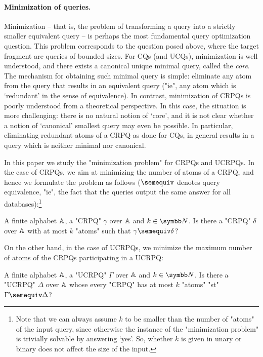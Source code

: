 \paragraph{Minimization of queries.}
Minimization -- that is, the problem of transforming a query into a strictly smaller equivalent 
query -- is perhaps the most fundamental query optimization question. This problem corresponds to the question posed above, where the target fragment are queries of bounded sizes. 
For CQs (and UCQs), minimization is well understood, and there exists a canonical unique minimal query, called the \emph{core}.
The mechanism for obtaining such minimal query is simple: eliminate any atom from the query that results in an equivalent query ("ie", any atom which is `redundant'  in the sense of equivalence).
In contrast, minimization of CRPQs is poorly understood from a theoretical perspective. In this case, the situation is more challenging: there is no natural notion of `core’, and it is not clear whether a notion of `canonical’ smallest query may even be possible. In particular, eliminating redundant atoms of a CRPQ as done for CQs, in general results in a query which is neither minimal nor canonical.

In this paper we study the "minimization problem" for CRPQs and UCRPQs. In the case of CRPQs, we aim at minimizing the number of atoms of a CRPQ, and hence we formulate the problem as follows ($\semequiv$ denotes query equivalence, "ie", the fact that the queries output the same answer for all databases):\footnote{Note that we can always assume $k$ to be smaller than the number of "atoms" of the input query, since otherwise the instance of the "minimization problem" is trivially solvable by answering `yes'. So, whether $k$ is given in unary or binary does not affect the size of the input.}

{A finite alphabet $\mathbb{A}$, a "CRPQ" $\gamma$ over $\mathbb{A}$ and $k \in \N$.}
{Is there a "CRPQ" $\delta$ over $\mathbb{A}$ with at most $k$ "atoms" 
such that $\gamma \semequiv \delta$?}
\medskip

On the other hand, in the case of UCRPQs, we minimize the maximum number of atoms of the CRPQs participating in a UCRPQ:
	
{A finite alphabet $\mathbb{A}$, a "UCRPQ" $\Gamma$ over $\mathbb{A}$ and $k \in \N$.}
{Is there a "UCRPQ" $\Delta$ over $\mathbb{A}$ whose every "CRPQ" has at most $k$ "atoms" 
"st" $\Gamma \semequiv \Delta$?}
\medskip

